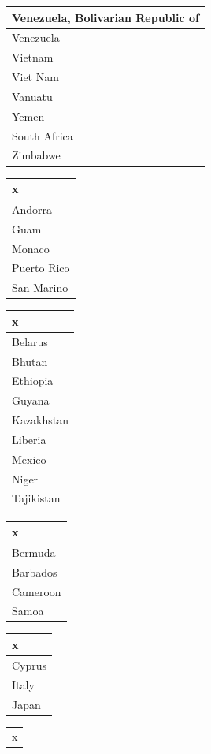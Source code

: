 \documentclass[]{article}
\begin{document}
\begin{table}
\begin{tabular}[t]{l}
Venezuela, Bolivarian Republic of\\
\hline
Venezuela\\
\hline
Vietnam\\
\hline
Viet Nam\\
\hline
Vanuatu\\
\hline
Yemen\\
\hline
South Africa\\
\hline
Zimbabwe\\
\hline
\end{tabular}
\centering
\begin{tabular}[t]{l}
\hline
x\\
\hline
Andorra\\
\hline
Guam\\
\hline
Monaco\\
\hline
Puerto Rico\\
\hline
San Marino\\
\hline
\end{tabular}
\centering
\begin{tabular}[t]{l}
\hline
x\\
\hline
Belarus\\
\hline
Bhutan\\
\hline
Ethiopia\\
\hline
Guyana\\
\hline
Kazakhstan\\
\hline
Liberia\\
\hline
Mexico\\
\hline
Niger\\
\hline
Tajikistan\\
\hline
\end{tabular}
\centering
\begin{tabular}[t]{l}
\hline
x\\
\hline
Bermuda\\
\hline
Barbados\\
\hline
Cameroon\\
\hline
Samoa\\
\hline
\end{tabular}
\centering
\begin{tabular}[t]{l}
\hline
x\\
\hline
Cyprus\\
\hline
Italy\\
\hline
Japan\\
\hline
\end{tabular}
\centering
\begin{tabular}[t]{l}
\hline
x\\



\end{tabular}
\end{table}
\end{document}
